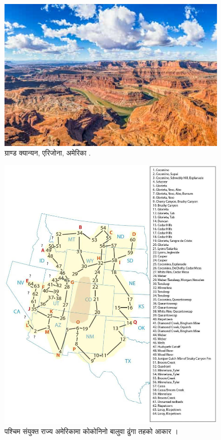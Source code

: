 \documentclass[10pt,twocolumn,letterpaper]{article}
\begin{document}
\begin{figure}[b]
\begin{center}
   \includegraphics[width=1\linewidth]{grand-canyon.jpg}

\end{center}
   \caption{ग्राण्ड क्यान्यन, एरिजोना, अमेरिका \cite{49}.}
\label{fig:2}
\label{fig:onecol}
\end{figure}

\begin{figure}[t]
\begin{center}
   \includegraphics[width=1\linewidth]{coconino.jpg}
\end{center}
   \caption{पश्चिम संयुक्त राज्य अमेरिकामा कोकोनिनो बालुवा ढुंगा तहको आकार \cite{21}।}
\label{fig:3}
\label{fig:onecol}
\end{figure}
\end{document}
